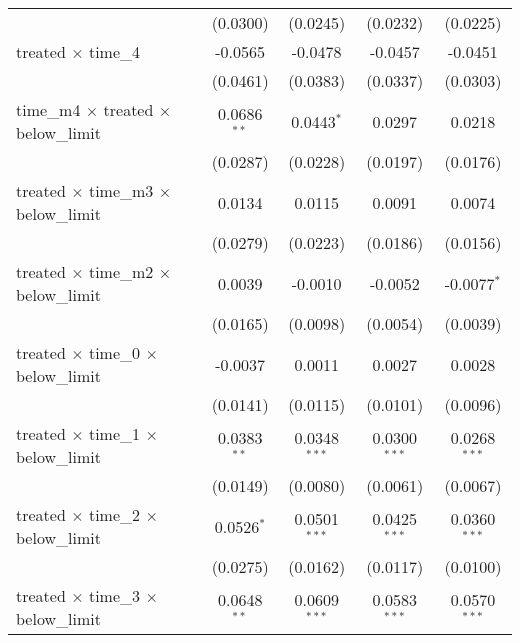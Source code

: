 \begin{tabular}{lcccc}
                                                       & (0.0300)        & (0.0245)        & (0.0232)        & (0.0225)\\   
   treated $\times$ time\_4                            & -0.0565         & -0.0478         & -0.0457         & -0.0451\\   
                                                       & (0.0461)        & (0.0383)        & (0.0337)        & (0.0303)\\   
   time\_m4 $\times$ treated $\times$ below\_limit     & 0.0686$^{**}$   & 0.0443$^{*}$    & 0.0297          & 0.0218\\   
                                                       & (0.0287)        & (0.0228)        & (0.0197)        & (0.0176)\\   
   treated $\times$ time\_m3 $\times$ below\_limit     & 0.0134          & 0.0115          & 0.0091          & 0.0074\\   
                                                       & (0.0279)        & (0.0223)        & (0.0186)        & (0.0156)\\   
   treated $\times$ time\_m2 $\times$ below\_limit     & 0.0039          & -0.0010         & -0.0052         & -0.0077$^{*}$\\   
                                                       & (0.0165)        & (0.0098)        & (0.0054)        & (0.0039)\\   
   treated $\times$ time\_0 $\times$ below\_limit      & -0.0037         & 0.0011          & 0.0027          & 0.0028\\   
                                                       & (0.0141)        & (0.0115)        & (0.0101)        & (0.0096)\\   
   treated $\times$ time\_1 $\times$ below\_limit      & 0.0383$^{**}$   & 0.0348$^{***}$  & 0.0300$^{***}$  & 0.0268$^{***}$\\   
                                                       & (0.0149)        & (0.0080)        & (0.0061)        & (0.0067)\\   
   treated $\times$ time\_2 $\times$ below\_limit      & 0.0526$^{*}$    & 0.0501$^{***}$  & 0.0425$^{***}$  & 0.0360$^{***}$\\   
                                                       & (0.0275)        & (0.0162)        & (0.0117)        & (0.0100)\\   
   treated $\times$ time\_3 $\times$ below\_limit      & 0.0648$^{**}$   & 0.0609$^{***}$  & 0.0583$^{***}$  & 0.0570$^{***}$\\   

\end{tabular}
